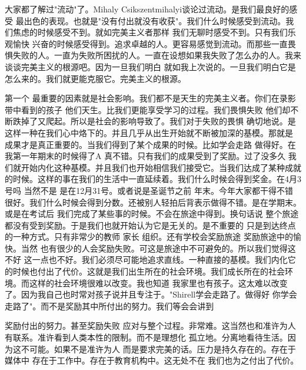 大家都了解过"流动"了。Mihaly Csikszentmihalyi谈论过流动。是我们最良好的感受 最出色的表现。也就是"没有付出就没有收获"。我们什么时候感受到流动。我们焦虑的时候感受不到。就如完美主义者那样 我们无聊时感受不到。只有我们乐观愉快 兴奋的时候感受得到。追求卓越的人。更容易感觉到流动。而那些一直畏惧失败的人。一直为失败所困扰的人。一直在设想如果我失败了怎么办的人。我来谈谈完美主义的根源吧。因为一旦我们明白 就如我上次说的。一旦我们明白它是怎么来的。我们就更能克服它。完美主义的根源。 

第一个 最重要的因素就是社会影响。我们都不是天生的完美主义者。你们在录影带中看到的孩子 他们天生。比我们更能享受学习的过程。我们畏惧失败 他们却不断跌掉了又爬起。所以是社会的影响导致了。我们对于失败的畏惧 确切地说。是这样一种在我们心中烙下的。并且几乎从出生开始就不断被加深的基模。那就是 成果才是真正重要的。当我们得到了某个成果的时候。比如学会走路 做得好。在我第一年期末的时候得了A 真不错。只有我们的成果受到了奖励。过了没多久 我们就开始内化这种基模。并且我们也开始相信我们接受它。当我们达成了某种成就的时候。这样的事在我们的生活中一直延续着。我们什么时候会得到奖金。在4月3号吗 当然不是 是在12月31号。或者说是圣诞节之前 年末。今年大家都干得不错 很好。我们什么时候会得到分数。还被别人轻拍后背表示做得不错。是在学期末。或是在考试后 我们完成了某些事的时候。不会在旅途中得到。换句话说 整个旅途都没有受到奖励。于是我们也就开始认为它是无关的。是不重要的 只是到达终点的一种方式。只有非常少的教师 家长 组织。还有学校会奖励旅途 奖励旅途中的愉快。当然 也有很少的人会奖励失败。可这是旅途中不可避免的。所以我们觉得这不好 这一点也不好。我们必须尽可能地追求直线。一种直接的基模。我们内化它的时候也付出了代价。这就是我们出生所在的社会环境。我们成长所在的社会环境。而这样的社会环境很难以改变。我也知道 我家里也有孩子。这太难以改变了。因为我自己也时常对孩子说并且专注于。"Shirell学会走路了。做得好 你学会走路了"。而不是奖励其中所付出的努力。我们等会会讲到 

奖励付出的努力。甚至奖励失败 应对与整个过程。非常难。这当然也和准许为人有联系。准许看到人类本性的限制。而不是理想化 孤立地。分离地看待生活。因为这不可能。如果不是准许为人 而是要求完美的话。压力是持久存在的。存在于媒体中 存在于工作中。存在于教育机构中。这无处不在 我们也为之付出了代价。 

